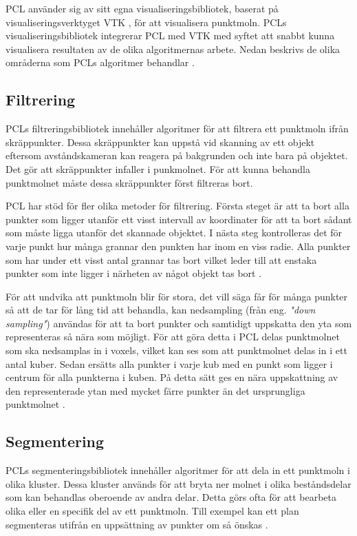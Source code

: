 PCL använder sig av sitt egna visualiseringsbibliotek, baserat på visualiseringsverktyget VTK \cite{VTK_book}, för att visualisera punktmoln. PCLs visualiseringsbibliotek integrerar PCL med VTK med syftet att snabbt kunna visualisera resultaten av de olika algoritmernas arbete. Nedan beskrivs de olika områderna som PCLs algoritmer behandlar \cite{rusu20113d}.

\subsection{Filtrering}
PCLs filtreringsbibliotek innehåller algoritmer för att filtrera ett punktmoln ifrån skräppunkter. Dessa skräppunkter kan uppstå vid skanning av ett objekt eftersom avståndskameran kan reagera på bakgrunden och inte bara på objektet. Det gör att skräppunkter infaller i punkmolnet. För att kunna behandla punktmolnet måste dessa skräppunkter först filtreras bort.

PCL har stöd för fler olika metoder för filtrering. Första steget är att ta bort alla punkter som ligger utanför ett visst intervall av koordinater för att ta bort sådant som måste ligga utanför det skannade objektet. I nästa steg kontrolleras det för varje punkt hur många grannar den punkten har inom en viss radie. Alla punkter som har under ett visst antal grannar tas bort vilket leder till att enstaka punkter som inte ligger i närheten av något objekt tas bort \cite{pcl_filtering}.

För att undvika att punktmoln blir för stora, det vill säga får för många punkter så att de tar för lång tid att behandla, kan nedsampling (från eng. \textit{"down sampling"}) användas för att ta bort punkter och samtidigt uppskatta den yta som representeras så nära som möjligt. För att göra detta i PCL delas punktmolnet som ska nedsamplas in i voxels, vilket kan ses som att punktmolnet delas in i ett antal kuber. Sedan ersätts alla punkter i varje kub med en punkt som ligger i centrum för alla punkterna i kuben. På detta sätt ges en nära uppskattning av den representerade ytan med mycket färre punkter än det ursprungliga punktmolnet \cite{voxel_grid}.
 
\subsection{Segmentering}
PCLs segmenteringsbibliotek innehåller algoritmer för att dela in ett punktmoln i olika kluster. Dessa kluster används för att bryta ner molnet i olika beståndsdelar som kan behandlas oberoende av andra delar. Detta görs ofta för att bearbeta olika eller en specifik del av ett punktmoln. Till exempel kan ett plan segmenteras utifrån en uppsättning av punkter om så önskas \cite{pcl_segmentation}. 
 
